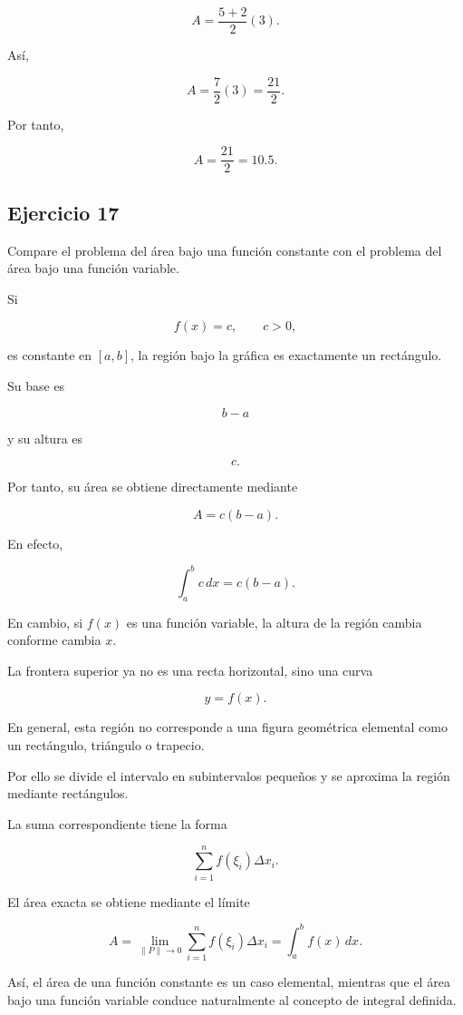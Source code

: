 \documentclass[12pt]{article}
\begin{document}
\[
A=
\frac{5+2}{2}(3).
\]

Así,

\[
A=
\frac72(3)
=
\frac{21}{2}.
\]

Por tanto,

\[
\boxed{
A=\frac{21}{2}=10.5
}.
\]

\subsection*{Ejercicio 17}

Compare el problema del área bajo una función constante con el problema
del área bajo una función variable.

Si

\[
f(x)=c,
\qquad c>0,
\]

es constante en \([a,b]\), la región bajo la gráfica es exactamente un
rectángulo.

Su base es

\[
b-a
\]

y su altura es

\[
c.
\]

Por tanto, su área se obtiene directamente mediante

\[
A=c(b-a).
\]

En efecto,

\[
\int_a^b c\,dx=c(b-a).
\]

En cambio, si \(f(x)\) es una función variable, la altura de la región
cambia conforme cambia \(x\).

La frontera superior ya no es una recta horizontal, sino una curva

\[
y=f(x).
\]

En general, esta región no corresponde a una figura geométrica elemental
como un rectángulo, triángulo o trapecio.

Por ello se divide el intervalo en subintervalos pequeños y se aproxima
la región mediante rectángulos.

La suma correspondiente tiene la forma

\[
\sum_{i=1}^{n}f(\xi_i)\Delta x_i.
\]

El área exacta se obtiene mediante el límite

\[
\boxed{
A=
\lim_{\|P\|\to0}
\sum_{i=1}^{n}
f(\xi_i)\Delta x_i
=
\int_a^b f(x)\,dx
}.
\]

Así, el área de una función constante es un caso elemental, mientras que
el área bajo una función variable conduce naturalmente al concepto de
integral definida.
\end{document}
